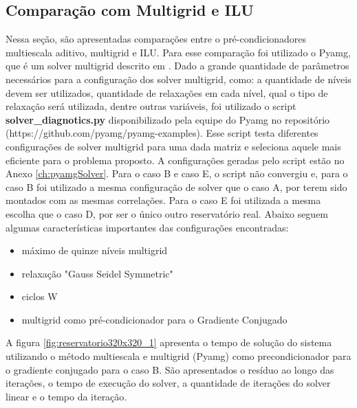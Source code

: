 





\subsection{Comparação com Multigrid e ILU}

Nessa seção, são apresentadas comparações entre o pré-condicionadores multiescala aditivo, multigrid e ILU. Para esse comparação foi utilizado o Pyamg, que é um solver multigrid  descrito em \citet{OlSc2018}. Dado a grande quantidade de parâmetros necessários para a configuração dos solver multigrid, como: a quantidade de níveis devem ser utilizados, quantidade de relaxações em cada nível, qual o tipo de relaxação será utilizada, dentre outras variáveis, foi utilizado o script \textbf{solver\_diagnotics.py} disponibilizado pela equipe do Pyamg no repositório (https://github.com/pyamg/pyamg-examples). Esse script testa diferentes configurações de solver multigrid para uma dada matriz e seleciona aquele mais eficiente para o problema proposto. A configurações geradas pelo script estão no Anexo \ref{ch:pyamgSolver}. Para o caso B e caso E, o script não convergiu e, para o caso B foi utilizado a mesma configuração de solver que o caso A, por terem sido montados com as mesmas correlações. Para o caso E foi utilizada a mesma escolha que o caso D, por ser o único outro reservatório real. Abaixo seguem algumas características importantes das configurações encontradas:

\begin{itemize}
    \item máximo de quinze níveis multigrid
    \item relaxação "Gauss Seidel Symmetric" 
    \item ciclos W
    \item multigrid como pré-condicionador para o Gradiente Conjugado
\end{itemize}


A figura \ref{fig:reservatorio320x320_1} apresenta o tempo de solução do sistema utilizando o método multiescala e multigrid (Pyamg) como precondicionador para o gradiente conjugado para o caso B. São apresentados o resíduo ao longo das iterações, o tempo de execução do solver, a quantidade de iterações do solver linear e o tempo da iteração.

